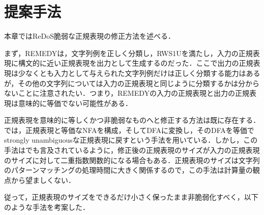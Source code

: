 \documentclass[a4paper, 12pt, dvipdfmx, uplatex]{jsreport}
\begin{document}
\chapter{提案手法}
本章ではReDoS脆弱な正規表現の修正方法を述べる．

まず，REMEDYは，文字列例を正しく分類し，RWS1Uを満たし，入力の正規表現に構文的に近い正規表現を出力として生成するのだった．ここで出力の正規表現は少なくとも入力として与えられた文字列例だけは正しく分類する能力はあるが，その他の文字列については入力の正規表現と同じように分類するかは分からないことに注意されたい．つまり，REMEDYの入力の正規表現と出力の正規表現は意味的に等価でない可能性がある．

正規表現を意味的に等しくかつ非脆弱なものへと修正する方法は既に存在する．\cite{harmless}では，正規表現と等価なNFAを構成，そしてDFAに変換し，そのDFAを等価でstrongly unambiguousな正規表現に戻すという手法を用いている．しかし，この手法は\cite{harmless}でも言及されているように，修正後の正規表現のサイズが入力の正規表現のサイズに対して二重指数関数的になる場合もある．正規表現のサイズは文字列のパターンマッチングの処理時間に大きく関係するので，この手法は計算量の観点から望ましくない．

従って，正規表現のサイズをできるだけ小さく保ったまま非脆弱化すべく，以下のような手法を考案した．






\end{document}
